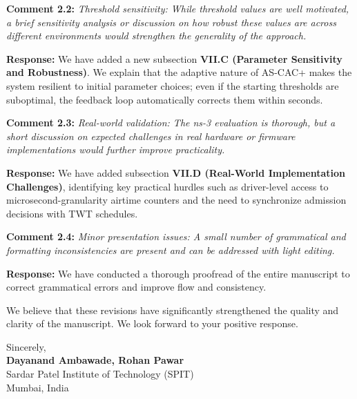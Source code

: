 \documentclass[11pt]{article}
\begin{document}
\vspace{0.3cm}

\noindent \textbf{Comment 2.2:} \textit{Threshold sensitivity: While threshold values are well motivated, a brief sensitivity analysis or discussion on how robust these values are across different environments would strengthen the generality of the approach.}

\noindent \textbf{Response:} We have added a new subsection \textbf{VII.C (Parameter Sensitivity and Robustness)}. We explain that the adaptive nature of AS-CAC+ makes the system resilient to initial parameter choices; even if the starting thresholds are suboptimal, the feedback loop automatically corrects them within seconds.

\vspace{0.3cm}

\noindent \textbf{Comment 2.3:} \textit{Real-world validation: The ns-3 evaluation is thorough, but a short discussion on expected challenges in real hardware or firmware implementations would further improve practicality.}

\noindent \textbf{Response:} We have added subsection \textbf{VII.D (Real-World Implementation Challenges)}, identifying key practical hurdles such as driver-level access to microsecond-granularity airtime counters and the need to synchronize admission decisions with TWT schedules.

\vspace{0.3cm}

\noindent \textbf{Comment 2.4:} \textit{Minor presentation issues: A small number of grammatical and formatting inconsistencies are present and can be addressed with light editing.}

\noindent \textbf{Response:} We have conducted a thorough proofread of the entire manuscript to correct grammatical errors and improve flow and consistency.

\vspace{0.5cm}

\noindent We believe that these revisions have significantly strengthened the quality and clarity of the manuscript. We look forward to your positive response.

\vspace{1cm}

\noindent Sincerely,\\
\textbf{Dayanand Ambawade, Rohan Pawar}\\
Sardar Patel Institute of Technology (SPIT)\\
Mumbai, India
\end{document}
